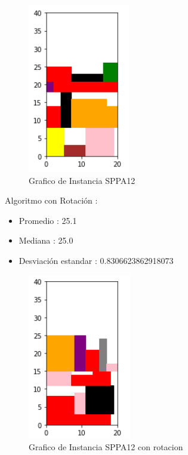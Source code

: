 \documentclass[10pt]{article}
\begin{document}
\begin{figure}[H]
\centerline{\includegraphics[width=0.5\linewidth]{5_sin_rotar.jpg}}
\caption{Grafico de Instancia SPPA12 }
\label{fig_9}
\end{figure} 


%
Algoritmo con Rotación : %
\begin{itemize}%
\item%
Promedio : 25.1%
\item%
Mediana : 25.0%
\item%
Desviación estandar : 0.8306623862918073%
\end{itemize}%

\begin{figure}[H]
\centerline{\includegraphics[width=0.5\linewidth]{5_con_rotar.jpg}}
\caption{Grafico de Instancia SPPA12  con rotacion}
\label{fig_10}
\end{figure} 
\end{document}
